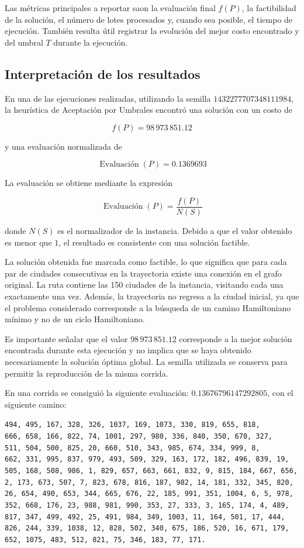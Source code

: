 \documentclass[11pt,a4paper]{article}
\begin{document}
Las métricas principales a reportar saon la evaluación final $f(P)$,
la factibilidad de la solución, el número de lotes procesados y,
cuando sea posible, el tiempo de ejecución. También resulta útil
registrar la evolución del mejor costo encontrado y del umbral $T$
durante la ejecución.


\subsection{Interpretación de los resultados}

En una de las ejecuciones realizadas, utilizando la semilla
\(1432277707348111984\), la heurística de Aceptación por Umbrales
encontró una solución con un costo de

$$ f(P)=98\,973\,851.12$$

y una evaluación normalizada de

$$ \operatorname{Evaluación}(P)=0.1369693 $$

La evaluación se obtiene mediante la expresión

$$ \operatorname{Evaluación}(P)=\frac{f(P)}{N(S)} $$

donde \(N(S)\) es el normalizador de la instancia. Debido a que el
valor obtenido es menor que \(1\), el resultado es consistente con una
solución factible.

La solución obtenida fue marcada como factible, lo que significa que
para cada par de ciudades consecutivas en la trayectoria existe una
conexión en el grafo original. La ruta contiene las 150 ciudades de la
instancia, visitando cada una exactamente una vez. Además, la
trayectoria no regresa a la ciudad inicial, ya que el problema
considerado corresponde a la búsqueda de un camino Hamiltoniano mínimo
y no de un ciclo Hamiltoniano.

Es importante señalar que el valor \(98\,973\,851.12\) corresponde a
la mejor solución encontrada durante esta ejecución y no implica que
se haya obtenido necesariamente la solución óptima global. La semilla
utilizada se conserva para permitir la reproducción de la misma
corrida.

En una corrida se consiguió la siguiente evaluación: $0.13676796147292805$, con el siguiente camino:

\begin{center}
\small
\texttt{494, 495, 167, 328, 326, 1037, 169, 1073, 330, 819, 655, 818, 666,}\
\texttt{658, 166, 822, 74, 1001, 297, 980, 336, 840, 350, 670, 327, 511,}\
\texttt{504, 500, 825, 20, 660, 510, 343, 985, 674, 334, 999, 8, 662,}\
\texttt{331, 995, 837, 979, 493, 509, 329, 163, 172, 182, 496, 839,}\
\texttt{19, 505, 168, 508, 986, 1, 829, 657, 663, 661, 832, 9, 815,}\
\texttt{184, 667, 656, 2, 173, 673, 507, 7, 823, 678, 816, 187, 982,}\
\texttt{14, 181, 332, 345, 820, 26, 654, 490, 653, 344, 665, 676, 22,}\
\texttt{185, 991, 351, 1004, 6, 5, 978, 352, 668, 176, 23, 988, 981,}\
\texttt{990, 353, 27, 333, 3, 165, 174, 4, 489, 817, 347, 499, 492,}\
\texttt{25, 491, 984, 349, 1003, 11, 164, 501, 17, 444, 826, 244, 339,}\
\texttt{1038, 12, 828, 502, 340, 675, 186, 520, 16, 671, 179, 652,}\
\texttt{1075, 483, 512, 821, 75, 346, 183, 77, 171.}
\end{center}
\end{document}
